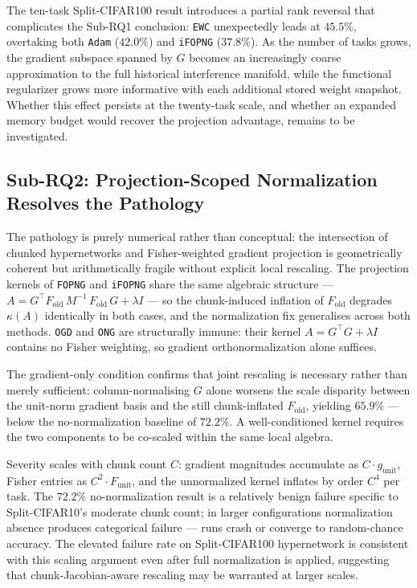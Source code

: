The ten-task Split-CIFAR100 result introduces a partial rank reversal
that complicates the Sub-RQ1 conclusion: \texttt{EWC} unexpectedly leads
at $45.5\%$, overtaking both \texttt{Adam} ($42.0\%$) and \texttt{iFOPNG}
($37.8\%$).
As the number of tasks grows, the gradient subspace spanned by $G$ becomes
an increasingly coarse approximation to the full historical interference
manifold, while the functional regularizer grows more informative with each
additional stored weight snapshot.
Whether this effect persists at the twenty-task scale, and whether an
expanded memory budget would recover the projection advantage, remains to
be investigated.


\subsection{Sub-RQ2: Projection-Scoped Normalization Resolves the Pathology}
The pathology is purely numerical rather than conceptual: the intersection
of chunked hypernetworks and Fisher-weighted gradient projection is
geometrically coherent but arithmetically fragile without explicit local
rescaling.
The projection kernels of \texttt{FOPNG} and \texttt{iFOPNG} share the
same algebraic structure --- $A = G^\top F_{\mathrm{old}}\,
M^{-1}\, F_{\mathrm{old}}\, G + \lambda I$ --- so the chunk-induced
inflation of $F_{\mathrm{old}}$ degrades $\kappa(A)$ identically in
both cases, and the normalization fix generalises across both methods.
\texttt{OGD} and \texttt{ONG} are structurally immune: their kernel
$A = G^\top G + \lambda I$ contains no Fisher weighting, so
gradient orthonormalization alone suffices.

The gradient-only condition confirms that joint rescaling is necessary
rather than merely sufficient: column-normalising $G$ alone worsens the
scale disparity between the unit-norm gradient basis and the still
chunk-inflated $F_{\mathrm{old}}$, yielding $65.9\%$ --- below the
no-normalization baseline of $72.2\%$.
A well-conditioned kernel requires the two components to be co-scaled
within the same local algebra.

Severity scales with chunk count $C$: gradient magnitudes accumulate
as $C \cdot g_{\mathrm{unit}}$, Fisher entries as $C^2 \cdot
F_{\mathrm{unit}}$, and the unnormalized kernel inflates by order $C^4$
per task.
The $72.2\%$ no-normalization result is a relatively benign failure
specific to Split-CIFAR10's moderate chunk count; in larger
configurations normalization absence produces categorical failure ---
runs crash or converge to random-chance accuracy.
The elevated failure rate on Split-CIFAR100 hypernetwork is consistent
with this scaling argument even after full normalization is applied,
suggesting that chunk-Jacobian-aware rescaling may be warranted at
larger scales.


